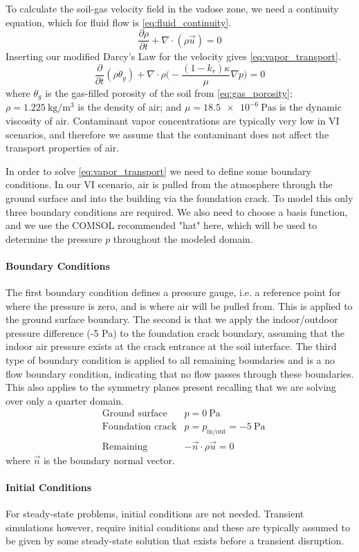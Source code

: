 To calculate the soil-gas velocity field in the vadose zone, we need a continuity equation, which for fluid flow is \eqref{eq:fluid_continuity}.
\begin{equation}\label{eq:fluid_continuity}
  \frac{\partial \rho}{\partial t} + \nabla \cdot (\rho \vec{u}) = 0
\end{equation}
Inserting our modified Darcy's Law for the velocity gives \eqref{eq:vapor_transport}.
\begin{equation}\label{eq:vapor_transport}
  \frac{\partial}{\partial t} (\rho \theta_g) + \nabla \cdot \rho \Big( -\frac{(1-k_r) \kappa}{\mu} \nabla p \Big) = 0
\end{equation}
where $\theta_g$ is the gas-filled porosity of the soil from \eqref{eq:gas_porosity};
$\rho = \SI{1.225}{\kilogram\per\metre\cubed}$ is the density of air;
and $\mu = \SI{18.5e-6}{\pascal\second}$ is the dynamic viscosity of air.
Contaminant vapor concentrations are typically very low in VI scenarios, and therefore we assume that the contaminant does not affect the transport properties of air.\par

In order to solve \eqref{eq:vapor_transport} we need to define some boundary conditions.
In our VI scenario, air is pulled from the atmosphere through the ground surface and into the building via the foundation crack.
To model this only three boundary conditions are required.
We also need to choose a basis function, and we use the COMSOL recommended "hat" here, which will be used to determine the pressure $p$ throughout the modeled domain.\par

\paragraph{Boundary Conditions}

The first boundary condition defines a pressure gauge, i.e. a reference point for where the pressure is zero, and is where air will be pulled from.
This is applied to the ground surface boundary.
The second is that we apply the indoor/outdoor pressure difference (-5 Pa) to the foundation crack boundary, assuming that the indoor air pressure exists at the crack entrance at the soil interface.
The third type of boundary condition is applied to all remaining boundaries and is a no flow boundary condition, indicating that no flow passes through these boundaries.
This also applies to the symmetry planes present recalling that we are solving over only a quarter domain.
\begin{align}
  &\text{Ground surface} &p = \SI{0}{\pascal} \\
  &\text{Foundation crack} &p = p_\mathrm{in/out} =\SI{-5}{\pascal} \\
  &\text{Remaining} &-\vec{n}\cdot\rho\vec{u} = 0
\end{align}
where $\vec{n}$ is the boundary normal vector.\par

\paragraph{Initial Conditions}

For steady-state problems, initial conditions are not needed.
Transient simulations however, require initial conditions and these are typically assumed to be given by some steady-state solution that exists before a transient disruption.\par
